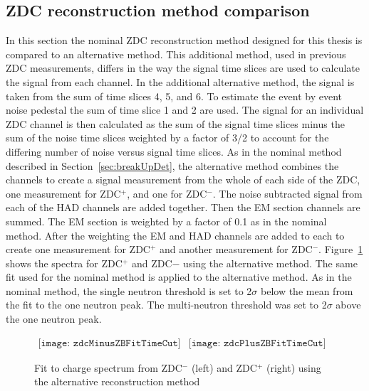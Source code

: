     \subsection{\label{sec:zdcCompare}ZDC reconstruction method comparison}
      In this section the nominal ZDC reconstruction method designed for this
        thesis is compared to an alternative method.
      This additional method, used in previous ZDC measurements, differs 
        in the way the signal time slices are used to calculate the signal from
        each channel.
      In the additional alternative method, the signal is taken from the sum of 
        time slices 4, 5, and 6.
      To estimate the event by event noise pedestal the sum of time slice 
        1 and 2 are used. 
      The signal for an individual ZDC channel is then calculated as the 
        sum of the signal time slices minus the sum of the noise time slices
        weighted by a factor of 3/2 to account for the differing number of 
        noise versus signal time slices.
      As in the nominal method described in Section~\ref{sec:breakUpDet}, 
        the alternative method combines the channels to create a signal 
        measurement from the whole of each side of the ZDC, one
        measurement for ZDC$^{+}$, and one for ZDC$^{-}$.
      The noise subtracted signal from each of the HAD channels are added 
        together.
      Then the EM section channels are summed. 
      The EM section is weighted by a factor of 0.1 as in the nominal method. 
      After the weighting the EM and HAD channels are added to each to create
        one measurement for ZDC$^{+}$ and another measurement for ZDC$^{-}$.
      Figure~\ref{fig:zdcM1Fit} shows the spectra for ZDC$^{+}$ and ZDC${-}$ 
        using the alternative method. 
      The same fit used for the nominal method is applied to the alternative 
        method. 
      As in the nominal method, the single neutron threshold is set to 2$\sigma$
        below the mean from the fit to the one neutron peak.
      The multi-neutron threshold was set to 2$\sigma$ above the one neutron
        peak.
      \begin{figure}[!Hhtb]
        \centering
        $ \begin{array}{cc}
          \texttt{[image: zdcMinusZBFitTimeCut]} &
          \texttt{[image: zdcPlusZBFitTimeCut]}
        \end{array} $
        \caption{Fit to charge spectrum from ZDC$^{-}$ (left) and ZDC$^{+}$ 
          (right) using the alternative reconstruction method}
        \label{fig:zdcM1Fit}
      \end{figure}

